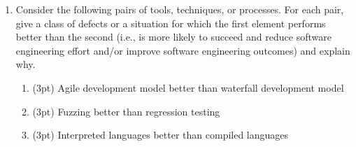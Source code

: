 \documentclass{report}
\newif\ifkey
\newcommand{\answerlong}[1]{\ifkey\color{red}\textbf{#1}\color{black}\else\vspace{0.5in}\fi\xspace}
\newcommand*{\pts}[1]{\addtocounter{points}{#1}(#1pt)}
\begin{document}
\begin{spacing}{1.4}
\begin{enumerate}[leftmargin=*]
    \item Consider the following pairs of tools, techniques, or processes. For each pair, give a class of defects or a
situation for which the first element performs better than the second (i.e., is more likely to succeed and reduce software
engineering effort and/or improve software engineering outcomes) and explain why.
\begin{enumerate}
\item \pts{3} Agile development model better than waterfall development model\\
  \answerlong{Agile is best when requirements are not fully known in advance and the customer is easy to access, because it relies on
    fast feedback cycles between your prototypes and the customer.}
\item \pts{3} Fuzzing better than regression testing \\
  \answerlong{Fuzzing is better if the existing test suite is very small. Another reasonable answer is that fuzzing can find new bugs, but regression testing only prevents bug that have occurred before.}
\item \pts{3} Interpreted languages better than compiled languages \\
  \answerlong{Interpreted languages are better for rapid prototyping and are usually easier to write code in.}
\end{enumerate}


\end{enumerate}
\end{spacing}
\end{document}
